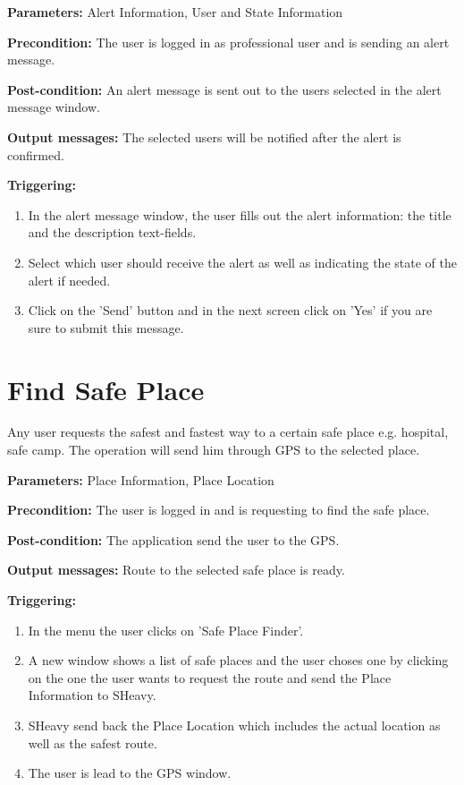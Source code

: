 \begin{description}

\item \textbf{Parameters:} Alert Information, User and State Information
\item \textbf{Precondition:} The user is logged in as professional user and is sending an alert message.
\item \textbf{Post-condition:}  An alert message is sent out to the users selected in the alert message window.
\item \textbf{Output messages:} The selected users will be notified after the alert is confirmed.

\item \textbf{Triggering:}
\begin{enumerate}
\item In the alert message window, the user fills out the alert information: the title and the description text-fields.
\item Select which user should receive the alert as well as indicating the state of the alert if needed.
\item Click on the 'Send' button and in the next screen click on 'Yes' if you
are sure to submit this message.
\end{enumerate}
\end{description}

\section{Find Safe Place}
\label{operation:FindSafePlace}
Any user requests the safest and fastest way to a certain safe place e.g. hospital,
safe camp. The operation will send him through GPS to the selected place.\\

\begin{description}

\item \textbf{Parameters:} Place Information, Place Location
\item \textbf{Precondition:} The user is logged in and is requesting to find the safe place.
\item \textbf{Post-condition:}  The application send the user to the GPS.
\item \textbf{Output messages:} Route to the selected safe place is ready.

\item \textbf{Triggering:}
\begin{enumerate}
\item In the menu the user clicks on 'Safe Place Finder'.
\item A new window shows a list of safe places and the user choses one by 
clicking on the one the user wants to request the route and send the Place Information to SHeavy.
\item SHeavy send back the Place Location which includes the actual location as well as the safest route.
\item The user is lead to the GPS window.
\end{enumerate}
\end{description}

